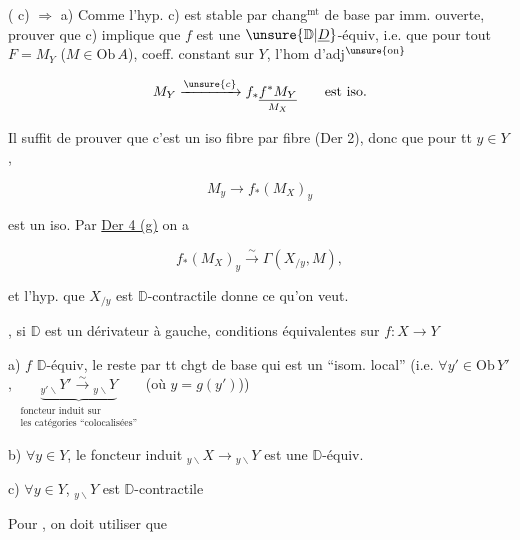 

( c) $\Longrightarrow$ a)  Comme l'hyp. c) est stable par chang$^{\mathrm{mt}}$ de base par imm. ouverte,   prouver que c) implique que $f$ est une $\unsure{\mathbb D|\underline D}$-équiv, i.e. que pour tout  $F=M_Y$ ($M\in\mathrm{Ob}\,A$), coeff. constant sur $Y$, l'hom d'adj$^{\unsure{\mathrm{on}}}$

\[ M_Y\xrightarrow{\unsure{c}}f_*\underset{M_X}{\underline{f^*M_Y}}\qquad\text{est iso.} \]

Il suffit de  prouver que c'est un iso fibre par fibre (Der 2), donc que pour tt $y\in Y$,

\[ M_y\longrightarrow f_*(M_X)_y \]

est un iso. Par \uline{Der 4 (g)} on a

\[ f_*(M_X)_y\xrightarrow{\sim}\Gamma(X_{/y},M), \]

et l'hyp. que  $X_{/y}$ est $\mathbb D$-contractile donne ce qu'on veut.


\uline{}, si $\mathbb D$ est un dérivateur à gauche, conditions équivalentes sur $f:X\longrightarrow Y$

a) $f$ $\mathbb D$-équiv, le reste par tt chgt de base  qui est un  ``isom. local'' (i.e. $\forall y'\in\mathrm{Ob}\,Y'$, $\underbrace{{}_{y'\backslash}Y'\xrightarrow{\sim}{}_{y\backslash}Y}_{\substack{\text{foncteur induit sur}\\\text{les catégories ``colocalisées''}}}$ (où $y=g(y')$))

b) $\forall y\in Y$, le foncteur induit $ {}_{y\backslash}X\longrightarrow{}_{y\backslash}Y$ est une $\mathbb D$-équiv.

c) $\forall y\in Y$, $ {}_{y\backslash}Y$ est $\mathbb D$-contractile

Pour , on doit utiliser que 

